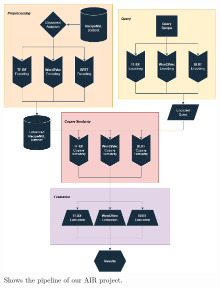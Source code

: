 \documentclass{article}
\begin{document}
\begin{figure}[!ht]
    \centering
    \includegraphics[width=1\linewidth]{graph.png}
    \caption{Shows the pipeline of our AIR project.}
    \label{fig:graph}
\end{figure}
\end{document}
